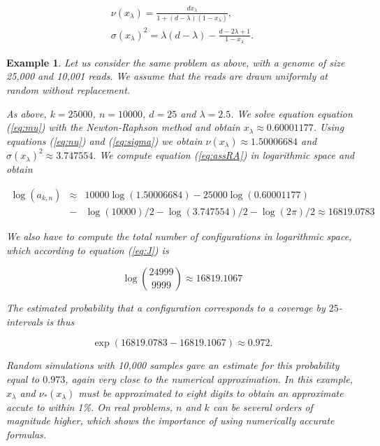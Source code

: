 \documentclass{article}
\newtheorem{example}{Example}
\begin{document}
\begin{gather}
\label{eq:nu} %
\nu(x_\lambda) = \frac{dx_\lambda}{1+(d-\lambda)(1-x_\lambda)}, \\
\label{eq:sigma} %
\sigma(x_\lambda)^2 = \lambda(d-\lambda) -
  \frac{d-2\lambda+1}{1-x_\lambda}.
\end{gather}


\begin{example}

Let us consider the same problem as above, with a genome of size 25,000
and 10,001 reads. We assume that the reads are drawn uniformly at random
without replacement.

As above, $k=25000$, $n=10000$, $d=25$ and $\lambda = 2.5$. We solve
equation equation (\ref{eq:mu}) with the Newton-Raphson method and obtain
$x_\lambda \approx 0.60001177$. Using equations (\ref{eq:nu}) and
(\ref{eq:sigma}) we obtain $\nu(x_\lambda) \approx 1.50006684$ and
$\sigma(x_\lambda)^2 \approx 3.747554$. We compute equation
(\ref{eq:assRA}) in logarithmic space and obtain

\begin{eqnarray*}
\log(a_{k,n}) &\approx& 10000\log(1.50006684) - 25000\log(0.60001177) \\
&-& \log(10000)/2 - \log(3.747554)/2 - \log(2\pi)/2
\approx 16819.0783
\end{eqnarray*}

We also have to compute the total number of configurations in
logarithmic space, which according to equation (\ref{eq:J}) is

\begin{equation*}
\log { 24999 \choose 9999 } \approx 16819.1067
\end{equation*}

The estimated probability that a configuration corresponds to a coverage
by $25$-intervals is
thus

\begin{equation*}
\exp(16819.0783-16819.1067) \approx 0.972.
\end{equation*}

Random simulations with 10,000 samples gave an estimate for this
probability equal to $0.973$, again very close to the numerical
approximation. In this example, $x_\lambda$ and $\nu_*(x_\lambda)$ must be
approximated to eight digits to obtain an approximate accute to within
1\%. On real problems, $n$ and $k$ can be several orders of magnitude
higher, which shows the importance of using numerically accurate formulas.

\end{example}
\end{document}
